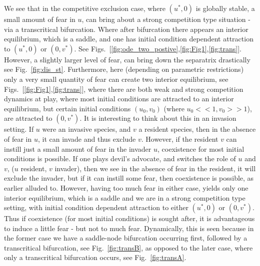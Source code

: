 \documentclass[10pt]{amsart}
\theoremstyle{definition}
\begin{document}
We see that in the competitive exclusion case, where $(u^{*},0)$ is globally stable, a small amount of fear in $u$, can bring about a strong competition type situation - via a transcritical bifurcation. Where after bifurcation there appears an interior equilibrium, which is a saddle, and one has initial condition dependent attraction to $(u^{*},0)$ or $(0,v^{*})$. See Figs.~[\ref{fig:ode_two_postive},\ref{fig:Fig1},\ref{fig:trans}]. However, a slightly larger level of fear, can bring down the separatrix drastically see Fig.~\ref{fig:dis_st}. Furthermore, here (depending on parametric restrictions) only a very small quantity of fear can create two interior equilibrium, see Figs.~[\ref{fig:Fig1},\ref{fig:trans}], where there are both weak and strong competition dynamics at play, where most initial conditions are attracted to an interior equilibrium, but certain initial conditions $(u_{0},v_{0})$ (where $u_{0} << 1, v_{0} >> 1$), are attracted to $(0,v^{*})$. It is interesting to think about this in an invasion setting. If $u$ were an invasive species, and $v$ a resident species, then in the absence of fear in $u$, it can invade and thus exclude $v$. However, if the resident $v$ can instill just a small amount of fear in the invader $u$, coexistence for most initial conditions is possible. If one plays devil's advocate, and switches the role of $u$ and $v$, ($u$ resident, $v$ invader), then we see in the absence of fear in the resident, it will exclude the invader, but if it can instill some fear, then coexistence is possible, as earlier alluded to. However, having too much fear in either case, yields only one interior equilibrium, which is a saddle and we are in a strong competition type setting, with initial condition dependent attraction to either $(u^{*},0)$ or $(0,v^{*})$. Thus if coexistence (for most initial conditions) is sought after, it is advantageous to induce a little fear  - but not to much fear. Dynamically, this is seen because in the former case we have a saddle-node bifurcation occurring first, followed by a transcritical bifurcation, see Fig.~\ref{fig:transB}, as opposed to the later case, where only a transcritical bifurcation occurs, see Fig.~\ref{fig:transA}.
\end{document}

